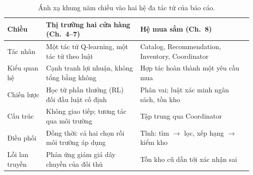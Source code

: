 \begin{table}[!htbp]\centering\caption{Ánh xạ khung năm chiều vào hai hệ đa tác tử của báo cáo.}\label{tab:ch3-map}
{\small\begin{tabular}{@{}L{2.6cm}L{5.9cm}L{6.0cm}@{}}\toprule
Chiều & Thị trường hai cửa hàng (Ch.~4--7) & Hệ mua sắm (Ch.~8) \\\midrule
Tác nhân & Một tác tử Q-learning, một tác tử theo luật & Catalog, Recommendation, Inventory, Coordinator \\
Kiểu quan hệ & Cạnh tranh lợi nhuận, không tổng bằng không & Hợp tác hoàn thành một yêu cầu mua \\
Chiến lược & Học từ phần thưởng (RL) đối đầu luật cố định & Phân vai; luật xác minh ngân sách, tồn kho \\
Cấu trúc & Không giao tiếp; tương tác qua môi trường & Tập trung qua Coordinator \\
Điều phối & Đồng thời: cả hai chọn rồi môi trường áp dụng & Tĩnh: tìm $\to$ lọc, xếp hạng $\to$ kiểm kho \\
Lỗi lan truyền & Phản ứng giảm giá dây chuyền của đối thủ & Tồn kho cũ dẫn tới xác nhận sai \\\bottomrule
\end{tabular}}
\end{table}

